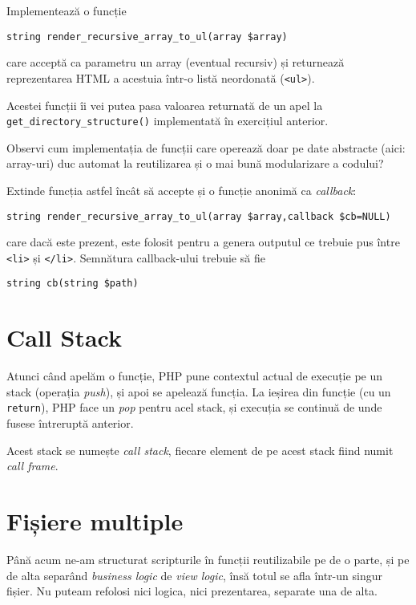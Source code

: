 \begin{Exercise}[title={Afișarea unei structuri de date recursive},difficulty=1]
\ExePart

Implementează o funcție
\begin{verbatim}
string render_recursive_array_to_ul(array $array)
\end{verbatim}
care acceptă ca parametru un array (eventual recursiv) și returnează
reprezentarea HTML a acestuia într-o listă neordonată (\texttt{<ul>}).

Acestei funcții îi vei putea pasa valoarea returnată
de un apel la \texttt{get\_directory\_structure()} implementată
în exercițiul anterior.

Observi cum implementația de funcții care operează
doar pe date abstracte (aici: array-uri) duc
automat la reutilizarea și o mai bună
modularizare a codului?

\ExePart

Extinde funcția astfel încât să accepte și o funcție anonimă
ca \textit{callback}:
\begin{verbatim}
string render_recursive_array_to_ul(array $array,callback $cb=NULL)
\end{verbatim}
care dacă este prezent, este folosit pentru a genera outputul
ce trebuie pus între \texttt{<li>} și \texttt{</li>}.
Semnătura callback-ului trebuie să fie
\begin{verbatim}
string cb(string $path)
\end{verbatim}
\end{Exercise}

\section{Call Stack}
Atunci când apelăm o funcție, PHP pune contextul actual de execuție
pe un stack (operația \textit{push}), și apoi se apelează funcția.
La ieșirea din funcție (cu un \texttt{return}), PHP face un
\textit{pop} pentru acel stack, și execuția se continuă de unde
fusese întreruptă anterior.

Acest stack se numește \textsl{call stack}, fiecare element
de pe acest stack fiind numit \textsl{call frame}.
\section{Fișiere multiple}
Până acum ne-am structurat scripturile în funcții reutilizabile pe de o parte,
și pe de alta separând \textit{business logic} de \textit{view logic}, însă
totul se afla într-un singur fișier. Nu puteam refolosi nici logica, nici
prezentarea, separate una de alta.

